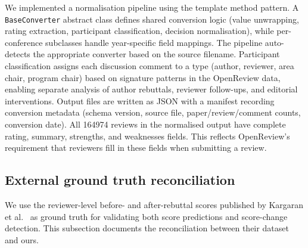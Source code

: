 \documentclass{article}
\newcommand{\code}[1]{\texttt{#1}}
\begin{document}
We implemented a normalisation pipeline using the template method pattern. A \code{BaseConverter} abstract class defines shared conversion logic (value unwrapping, rating extraction, participant classification, decision normalisation), while per-conference subclasses handle year-specific field mappings. The pipeline auto-detects the appropriate converter based on the source filename. Participant classification assigns each discussion comment to a type (author, reviewer, area chair, program chair) based on signature patterns in the OpenReview data, enabling separate analysis of author rebuttals, reviewer follow-ups, and editorial interventions. Output files are written as JSON with a manifest recording conversion metadata (schema version, source file, paper/review/comment counts, conversion date). All \num{164974} reviews in the normalised output have complete rating, summary, strengths, and weaknesses fields. This reflects OpenReview's requirement that reviewers fill in these fields when submitting a review.

\subsection{External ground truth reconciliation}\label{app:ext-gt}

We use the reviewer-level before- and after-rebuttal scores published by Kargaran et al.~\cite{kargaran} as ground truth for validating both score predictions and score-change detection. This subsection documents the reconciliation between their dataset and ours.
\end{document}
